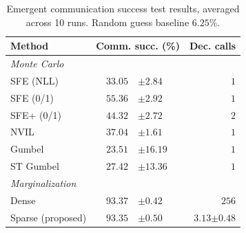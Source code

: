 \begin{table}[t]
    \begin{center}
        \begin{tabular}{lr@{~}lr}
            \toprule
            Method                                 & \multicolumn{2}{c}{Comm. succ. (\%)} & Dec. calls                             \\
            \midrule
            {\emph{Monte Carlo}}                   &                                      &                                &       \\
            SFE (NLL)                              & $33.05$                              & {\tiny\color{gray}$\pm 2.84$}  & $1$   \\
            SFE (0/1)                              & $55.36$                              & {\tiny\color{gray}$\pm 2.92$}  & $1$   \\
            SFE$+$ (0/1)                           & $44.32$                              & {\tiny\color{gray}$\pm 2.72$}  & $2$   \\
            NVIL                                   & $37.04$                              & {\tiny\color{gray}$\pm 1.61$}  & $1$   \\
            Gumbel                                 & $23.51$                              & {\tiny\color{gray}$\pm 16.19$} & $1$   \\
            ST Gumbel                              & $27.42$                              & {\tiny\color{gray}$\pm 13.36$} & $1$   \\
            \spacerule
            \emph{Marginalization}                 &                                      &                                &       \\
            Dense                                  & $93.37$                              & {\tiny\color{gray}$\pm 0.42$}  & $256$ \\
            Sparse {\small \color{gray}(proposed)} &
            $93.35$                                & {\tiny\color{gray}$\pm 0.50$}        &
            $3.13${\tiny\color{gray}$\pm 0.48$}                                                                                    \\
            \bottomrule
        \end{tabular}
    \end{center}
    \caption{Emergent communication success test results,
        averaged across 10 runs. Random guess baseline $6.25\%$.}
    \label{tab:symbol}
\end{table}

